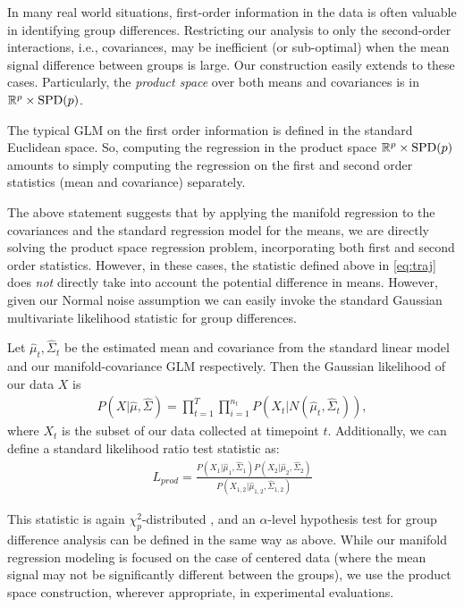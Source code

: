 In many real world situations, first-order information in the data is often valuable in identifying group differences. Restricting 
our analysis to only the second-order interactions, i.e., covariances, may be inefficient (or sub-optimal) when the mean signal difference between groups is large. Our construction easily extends to these cases. Particularly, the \textit{product space} over both means and covariances is in $\mathbb{R}^{p} \times \text{SPD}{(p)}$. 
\begin{remark}
The typical GLM on the first order information is defined in the standard Euclidean space. So, computing the regression in the product space 
$\mathbb{R}^{p} \times \text{SPD}{(p)}$ 
amounts to simply 
computing the regression on the first and second order statistics (mean and covariance) separately.
\end{remark}
The above statement suggests that by applying the manifold regression to the covariances and the standard regression model for the means, 
we are directly solving the product space regression problem, incorporating both first and second order statistics.
However, in these cases, the statistic defined above in \eqref{eq:traj} does {\em not} directly take into account the potential difference in means. 
However, given our Normal noise assumption we can easily invoke the standard Gaussian multivariate likelihood statistic for group differences.
\begin{definition}
Let $\hat{\mu}_t, \hat{\Sigma}_t$ be the estimated mean and covariance from the standard linear model and our manifold-covariance GLM respectively. Then the Gaussian likelihood of our data $X$ is
\begin{align}
P(X|\hat{\mu},\hat{\Sigma}) = \prod_{t=1}^{T}\prod_{i=1}^{n_t} P(X_t | N(\hat{\mu}_t,\hat{\Sigma}_t)),
\end{align}
where $X_t$ is the subset of our data collected at timepoint $t$. Additionally, we can define a standard likelihood ratio test statistic as:
\begin{align}
L_{prod} = \frac{P(X_1|\hat{\mu}_1,\hat{\Sigma}_1)P(X_2|\hat{\mu}_2,\hat{\Sigma}_2)}{P(X_{1,2}|\hat{\mu}_{1,2},\hat{\Sigma}_{1,2})}
\end{align}
\end{definition}
This statistic is again $\chi^2_{p}$-distributed \citep{seber2003linear}, and an $\alpha$-level hypothesis test for group difference analysis 
can be defined in the same way as above. While our manifold regression modeling is focused on the case of centered data (where the mean signal may not be 
significantly different between the groups), we use the product space construction, wherever appropriate, in experimental evaluations.

